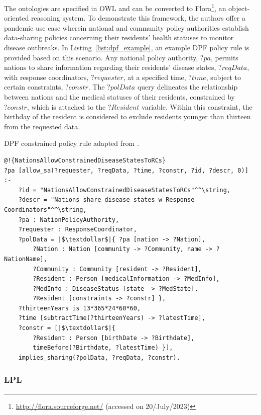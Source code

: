 The ontologies are specified in OWL and can be converted to Flora\footnote{\url{http://flora.sourceforge.net/} (accessed on 20/July/2023)}, an object-oriented reasoning system. 
To demonstrate this framework, the authors offer a pandemic use case wherein national and community policy authorities establish data-sharing policies concerning their residents' health statuses to monitor disease outbreaks. 
In Listing~\ref{list:dpf_example}, an example DPF policy rule is provided based on this scenario.
Any national policy authority, $?pa$, permits nations to share information regarding their residents' disease states, $?reqData$, with response coordinators, $?requester$, at a specified time, $?time$, subject to certain constraints, $?constr$. 
The $?polData$ query delineates the relationship between nations and the medical statuses of their residents, constrained by $?constr$, which is attached to the $?Resident$ variable.
Within this constraint, the birthday of the resident is considered to exclude residents younger than thirteen from the requested data.

\begin{listing}[ht]
\caption{DPF constrained policy rule adapted from \cite{martiny_protecting_2018}.}
\label{list:dpf_example}
\begin{verbatim}
@!{NationsAllowConstrainedDiseaseStatesToRCs}
?pa [allow_sa(?requester, ?reqData, ?time, ?constr, ?id, ?descr, 0)] :-
    ?id = "NationsAllowConstrainedDiseaseStatesToRCs"^^\string,
    ?descr = "Nations share disease states w Response Coordinators"^^\string,
    ?pa : NationPolicyAuthority,
    ?requester : ResponseCoordinator,
    ?polData = |$\textdollar$|{ ?pa [nation -> ?Nation],
        ?Nation : Nation [community -> ?Community, name -> ?NationName],
        ?Community : Community [resident -> ?Resident],
        ?Resident : Person [medicalInformation -> ?MedInfo],
        ?MedInfo : DiseaseStatus [state -> ?MedState],
        ?Resident [constraints -> ?constr] },
    ?thirteenYears is 13*365*24*60*60, 
    ?time [subtractTime(?thirteenYears) -> ?latestTime],
    ?constr = [|$\textdollar$|{ 
        ?Resident : Person [birthDate -> ?Birthdate],
        timeBefore(?Birthdate, ?latestTime) }],
    implies_sharing(?polData, ?reqData, ?constr).
\end{verbatim}
\end{listing}

\subsubsection{LPL}
\label{sec:lpl}

